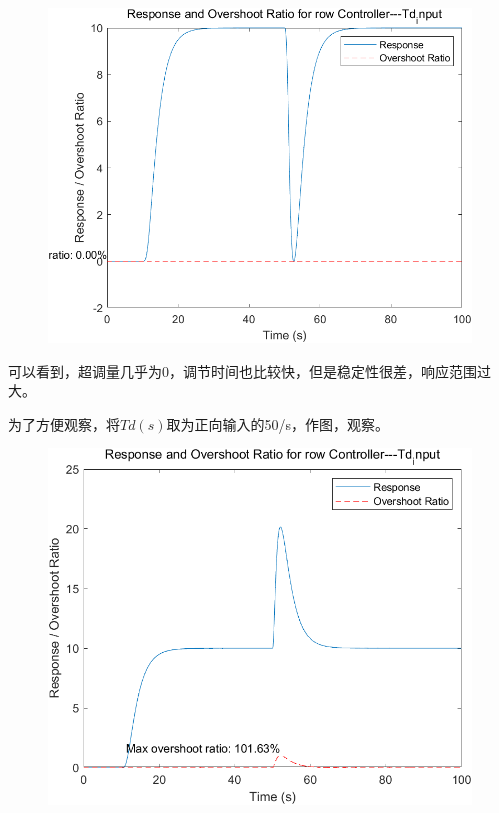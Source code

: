 \documentclass{thuemp}
\begin{document}
\begin{figure}[H]
\centering
\includegraphics[width=1\linewidth]{./img/None_p3_Td.png}
\end{figure}

可以看到，超调量几乎为0，调节时间也比较快，但是稳定性很差，响应范围过大。

为了方便观察，$将Td(s)$取为正向输入的50/s，作图，观察。

\begin{figure}[H]
\centering
\includegraphics[width=1\linewidth]{./img/None_p2_Td.png}
\end{figure}
\end{document}
